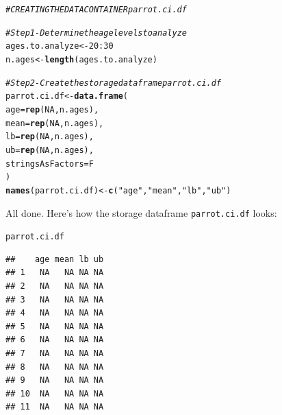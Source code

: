 \documentclass{tufte-book}\usepackage[]{graphicx}\usepackage[]{color}
\makeatletter
\newcommand{\hlnum}[1]{\textcolor[rgb]{0.686,0.059,0.569}{#1}}%
\newcommand{\hlstr}[1]{\textcolor[rgb]{0.192,0.494,0.8}{#1}}%
\newcommand{\hlcom}[1]{\textcolor[rgb]{0.678,0.584,0.686}{\textit{#1}}}%
\newcommand{\hlopt}[1]{\textcolor[rgb]{0,0,0}{#1}}%
\newcommand{\hlstd}[1]{\textcolor[rgb]{0.345,0.345,0.345}{#1}}%
\newcommand{\hlkwb}[1]{\textcolor[rgb]{0.69,0.353,0.396}{#1}}%
\newcommand{\hlkwc}[1]{\textcolor[rgb]{0.333,0.667,0.333}{#1}}%
\newcommand{\hlkwd}[1]{\textcolor[rgb]{0.737,0.353,0.396}{\textbf{#1}}}%
\newenvironment{kframe}{%
 \def\at@end@of@kframe{}%
 \ifinner\ifhmode%
  \def\at@end@of@kframe{\end{minipage}}%
  \begin{minipage}{\columnwidth}%
 \fi\fi%
 \def\FrameCommand##1{\hskip\@totalleftmargin \hskip-\fboxsep
 \colorbox{shadecolor}{##1}\hskip-\fboxsep
     \hskip-\linewidth \hskip-\@totalleftmargin \hskip\columnwidth}%
 \MakeFramed {\advance\hsize-\width
   \@totalleftmargin\z@ \linewidth\hsize
   \@setminipage}}%
 {\par\unskip\endMakeFramed%
 \at@end@of@kframe}
\newenvironment{knitrout}{}{} %
\makeatother
\begin{document}
\begin{footnotesize}
\begin{knitrout}
\color{fgcolor}\begin{kframe}
\begin{alltt}
\hlcom{# CREATING THE DATA CONTAINER parrot.ci.df}

\hlcom{# Step 1 - Determine the age levels to analyze}
\hlstd{ages.to.analyze} \hlkwb{<-} \hlnum{20}\hlopt{:}\hlnum{30}
\hlstd{n.ages} \hlkwb{<-} \hlkwd{length}\hlstd{(ages.to.analyze)}

\hlcom{# Step 2 - Create the storage dataframe parrot.ci.df}
\hlstd{parrot.ci.df} \hlkwb{<-} \hlkwd{data.frame}\hlstd{(}
  \hlkwc{age} \hlstd{=} \hlkwd{rep}\hlstd{(}\hlnum{NA}\hlstd{, n.ages),}
  \hlkwc{mean} \hlstd{=} \hlkwd{rep}\hlstd{(}\hlnum{NA}\hlstd{, n.ages),}
  \hlkwc{lb} \hlstd{=} \hlkwd{rep}\hlstd{(}\hlnum{NA}\hlstd{, n.ages),}
  \hlkwc{ub} \hlstd{=} \hlkwd{rep}\hlstd{(}\hlnum{NA}\hlstd{, n.ages),}
  \hlkwc{stringsAsFactors} \hlstd{= F}
\hlstd{)}
\hlkwd{names}\hlstd{(parrot.ci.df)} \hlkwb{<-} \hlkwd{c}\hlstd{(}\hlstr{"age"}\hlstd{,} \hlstr{"mean"}\hlstd{,} \hlstr{"lb"}\hlstd{,} \hlstr{"ub"}\hlstd{)}
\end{alltt}
\end{kframe}
\end{knitrout}
\end{footnotesize}

All done. Here's how the storage dataframe \texttt{parrot.ci.df} looks:

\begin{footnotesize}
\begin{knitrout}
\color{fgcolor}\begin{kframe}
\begin{alltt}
\hlstd{parrot.ci.df}
\end{alltt}
\begin{verbatim}
##    age mean lb ub
## 1   NA   NA NA NA
## 2   NA   NA NA NA
## 3   NA   NA NA NA
## 4   NA   NA NA NA
## 5   NA   NA NA NA
## 6   NA   NA NA NA
## 7   NA   NA NA NA
## 8   NA   NA NA NA
## 9   NA   NA NA NA
## 10  NA   NA NA NA
## 11  NA   NA NA NA
\end{verbatim}
\end{kframe}
\end{knitrout}
\end{footnotesize}
\end{document}
